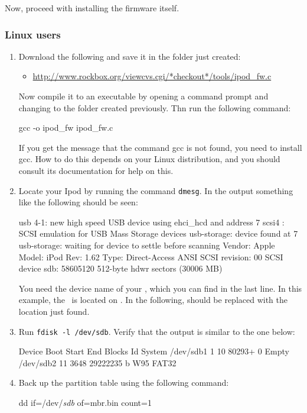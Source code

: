 Now, proceed with installing the firmware itself.

\subsubsection{Linux users}
\begin{enumerate}
  \item Download the following and save it in the folder just
    created:
    \begin{itemize}
      \item \url{http://www.rockbox.org/viewcvs.cgi/*checkout*/tools/ipod_fw.c}
    \end{itemize}
    Now compile it to an executable by opening a command prompt and changing
    to the folder created previously. Thn run the following command:
    \begin{code}
    gcc -o ipod_fw ipod_fw.c
    \end{code}
    If you get the message that the command gcc is not found, you need to
    install gcc. How to do this depends on your Linux distribution, and
    you should consult its documentation for help on this.
  \item Locate your Ipod by running the command \verb|dmesg|. In the output
    something like the following should be seen:
\begin{code}
    usb 4-1: new high speed USB device using ehci_hcd and address 7
    scsi4 : SCSI emulation for USB Mass Storage devices
    usb-storage: device found at 7
    usb-storage: waiting for device to settle before scanning
      Vendor: Apple     Model: iPod              Rev: 1.62
      Type:   Direct-Access                      ANSI SCSI revision: 00
    SCSI device sdb: 58605120 512-byte hdwr sectors (30006 MB)
\end{code}
    You need the device name of your \dap, which you can find in the last line.
    In this example, the \dap\ is located on . In the following,
     should be replaced with the location just found.
  \item Run \verb|fdisk -l /dev/sdb|. Verify that the
    output is similar to the one below:
    \begin{code}
       Device Boot      Start         End      Blocks   Id  System
    /dev/sdb1               1          10       80293+   0  Empty
    /dev/sdb2              11        3648    29222235    b  W95 FAT32
    \end{code}
  \item Back up the partition table using the following command:
    \begin{code}
    dd if=/dev/\emph{sdb} of=mbr.bin count=1
    \end{code}


\end{enumerate}
